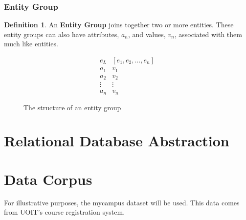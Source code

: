 \documentclass[12pt,letterpaper,oneside,notitlepage]{report}
\theoremstyle{definition}
\newtheorem{defn}{Definition}
\begin{document}
        \subsubsection{Entity Group}
          \begin{defn}
            An \textbf{Entity Group} joins together two or more entities.  These entity groups can also have attributes, $a_n$, and values, $v_n$, associated with them much like entities.

            \begin{figure}[!ht]
              \centering
              \[
                \begin{array}{ll}
                  e_L & \left[ e_1, e_2, \ldots, e_n \right] \\
                  a_1 & v_1 \\
                  a_2 & v_2 \\
                  \vdots & \vdots \\
                  a_n & v_n
                \end{array}
              \]
              \caption{The structure of an entity group}
              \label{fig:entity-group-rep}
            \end{figure}

%
%              
%
          \end{defn}
          
    \section{Relational Database Abstraction}
    \label{sec:database-abstraction}
    
    \section{Data Corpus}
    \label{sec:data-corpus}
      For illustrative purposes, the mycampus dataset will be used.  This data comes from UOIT's course registration system.
      
\end{document}
